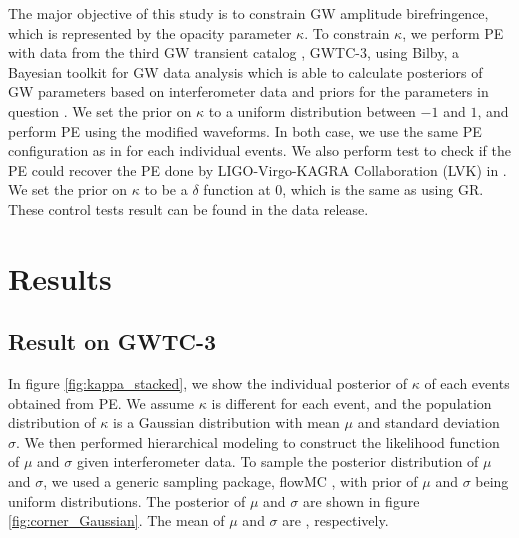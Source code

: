 \documentclass[aps,prd,twocolumn,superscriptaddress,preprintnumbers,floatfix,nofootinbib]{revtex4-2}
\begin{document}
The major objective of this study is to constrain GW amplitude birefringence, which is represented by the opacity parameter $\kappa$.
To constrain $\kappa$, we perform PE with data from the third GW transient catalog \citep{GWTC-2.1, GWTC-3}, GWTC-3, using Bilby, a Bayesian toolkit for GW data analysis which is able to calculate posteriors of GW parameters based on interferometer data and priors for the parameters in question \citep{Bilby}. 
We set the prior on $\kappa$ to a uniform distribution between $-1$ and $1$, and perform PE using the modified waveforms.
In both case, we use the same PE configuration as in \citet{GWTC-2.1, GWTC-3} for each individual events.
We also perform test to check if the PE could recover the PE done by LIGO-Virgo-KAGRA Collaboration (LVK) in \citet{GWTC-2.1, GWTC-3}.
We set the prior on $\kappa$ to be a $\delta$ function at $0$, which is the same as using GR.
These control tests result can be found in the data release.

\section{Results}
\label{sec:Results}
\subsection{Result on GWTC-3}

In figure \ref{fig:kappa_stacked}, we show the individual posterior of $\kappa$ of each events obtained from PE.
We assume $\kappa$ is different for each event, and the population distribution of $\kappa$ is a Gaussian distribution with mean $\mu$ and standard deviation $\sigma$.
We then performed hierarchical modeling to construct the likelihood function of $\mu$ and $\sigma$ given interferometer data.
To sample the posterior distribution of $\mu$ and $\sigma$, we used a generic sampling package, flowMC \citep{flowMC}, with prior of $\mu$ and $\sigma$ being uniform distributions.
The posterior of $\mu$ and $\sigma$ are shown in figure \ref{fig:corner_Gaussian}.
The mean of $\mu$ and $\sigma$ are , respectively.
\end{document}
